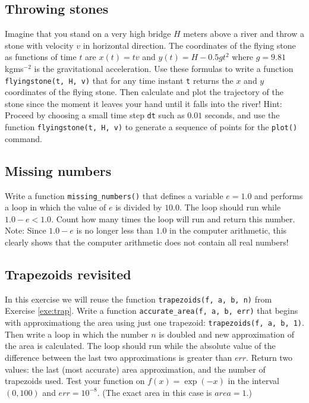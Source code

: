 \subsection{Throwing stones}

Imagine that you stand on a very high bridge $H$ meters above 
a river and throw a stone with velocity $v$ in horizontal direction. 
The coordinates of the flying stone as functions of time $t$ are
$x(t) = t v$ and $y(t) = H - 0.5gt^2$ where $g = 9.81$ kgms$^{-2}$ is
the gravitational acceleration. Use these formulas to write a function 
{\tt flyingstone(t, H, v)} that for any time instant {\tt t} returns the $x$ and 
$y$ coordinates of the flying stone. Then calculate and plot the trajectory 
of the stone since the moment it leaves your hand until it falls into the 
river! Hint: Proceed by choosing a small time step {\tt dt} such 
as $0.01$ seconds, and use the function {\tt flyingstone(t, H, v)} to generate 
a sequence of points for the {\tt plot()} command.  


\subsection{Missing numbers}

Write a function {\tt missing\_numbers()} that defines a variable $e = 1.0$ 
and performs a loop in which the value of $e$ is divided by $10.0$. The loop should
run while $1.0 - e < 1.0$. Count how many times the loop will run and return 
this number. Note: Since $1.0 - e$ is no longer less than $1.0$ in the 
computer arithmetic, this clearly shows that the computer arithmetic
does not contain all real numbers!


\subsection{Trapezoids revisited}

In this exercise we will reuse the function {\tt trapezoids(f, a, b, n)}
from Exercise \ref{exe:trap}. Write a function {\tt accurate\_area(f, a, b, err)}
that begins with approximationg the area  using just one trapezoid: 
{\tt trapezoids(f, a, b, 1)}. Then write a loop in which the number 
$n$ is doubled and new approximation of the area is calculated. The loop should 
run while the absolute value of the difference between the last two approximations 
is greater than $err$. Return two values: the last (most accurate) area approximation, 
and the number of trapezoids used. Test your function on $f(x) = \exp(-x)$
in the interval $(0, 100)$ and $err = 10^{-8}$. (The exact area in this case is $area = 1$.)

